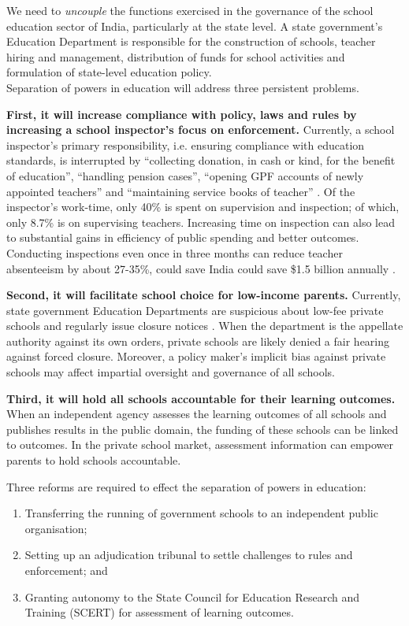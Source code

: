\documentclass[a4paper, 12pt, twoside]{article}
\begin{document}
We need to \textit{uncouple} the functions exercised in the governance of the school education sector of India, particularly at the state level. A state government’s Education Department is responsible for the construction of schools, teacher hiring and management, distribution of funds for school activities and formulation of state-level education policy.
\\

Separation of powers in education will address three persistent problems.

\textbf{First, it will increase compliance with policy, laws and rules by increasing a school inspector’s focus on enforcement.} Currently, a school inspector’s primary responsibility, i.e. ensuring compliance with education standards, is interrupted by “collecting donation, in cash or kind, for the benefit of education”, “handling pension cases”, “opening GPF accounts of newly appointed teachers” and “maintaining service books of teacher” \parencite{deo_chart}. Of the inspector’s work-time, only 40\% is spent on supervision and inspection; of which, only 8.7\% is on supervising teachers. Increasing time on inspection can also lead to substantial gains in efficiency of public spending and better outcomes. Conducting inspections even once in three months can reduce teacher absenteeism by about 27-35\%, could save India could save \$1.5 billion annually \parencite{karthik_m_10b}. 

\textbf{Second, it will facilitate school choice for low-income parents.} Currently, state government Education Departments are suspicious about low-fee private schools and regularly issue closure notices \parencite{nisa}. When the department is the appellate authority against its own orders, private schools are likely denied a fair hearing against forced closure. Moreover, a policy maker’s implicit bias against private schools may affect impartial oversight and governance of all schools.

\textbf{Third, it will hold all schools accountable for their learning outcomes.} When an independent agency assesses the learning outcomes of all schools and publishes results in the public domain, the funding of these schools can be linked to outcomes. In the private school market, assessment information can empower parents to hold schools accountable.

Three reforms are required to effect the separation of powers in education:

\begin{enumerate}[noitemsep]

\item Transferring the running of government schools to an independent public organisation;

\item Setting up an adjudication tribunal to settle challenges to rules and enforcement; and

\item Granting autonomy to the State Council for Education Research and Training (SCERT) for assessment of learning outcomes.

\end{enumerate} 
\end{document}
